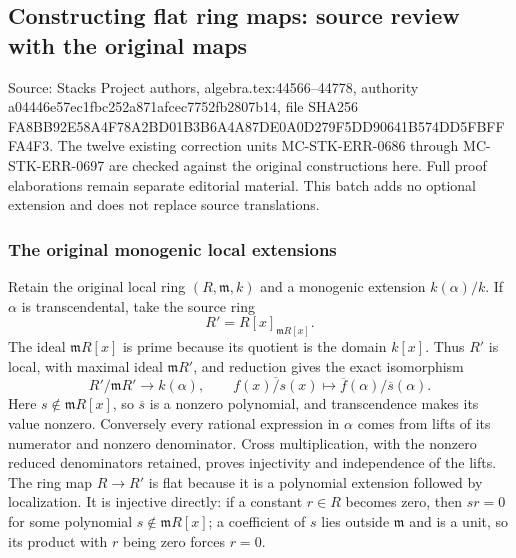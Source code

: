 \subsection{Constructing flat ring maps: source review with the original maps}\label{algebra-proof-064-constructing-flat-ring-maps-source-review-with-the-original-maps}

Source: Stacks Project authors, algebra.\AlgebraIdentifierBreak{}tex:\AlgebraIdentifierBreak{}44566--\AlgebraIdentifierBreak{}44778, authority a044\allowbreak{}46e5\allowbreak{}7ec1\allowbreak{}fbc2\allowbreak{}52a8\allowbreak{}71af\allowbreak{}cec7\allowbreak{}752f\allowbreak{}b280\allowbreak{}7b14, file SHA256 FA8B\allowbreak{}B92E\allowbreak{}58A4\allowbreak{}F78A\allowbreak{}2BD0\allowbreak{}1B3B\allowbreak{}6A4A\allowbreak{}87DE\allowbreak{}0A0D\allowbreak{}279F\allowbreak{}5DD9\allowbreak{}0641\allowbreak{}B574\allowbreak{}DD5F\allowbreak{}BFFF\allowbreak{}A4F3. The twelve existing correction units MC-\AlgebraIdentifierBreak{}STK-\AlgebraIdentifierBreak{}ERR-\AlgebraIdentifierBreak{}0686 through MC-\AlgebraIdentifierBreak{}STK-\AlgebraIdentifierBreak{}ERR-\AlgebraIdentifierBreak{}0697 are checked against the original constructions here. Full proof elaborations remain separate editorial material. This batch adds no optional extension and does not replace source translations.

\subsubsection{The original monogenic local extensions}\label{algebra-proof-064-the-original-monogenic-local-extensions}

Retain the original local ring \((R,\mathfrak m,k)\) and a monogenic extension \(k(\alpha)/k\). If \(\alpha\) is transcendental, take the source ring \[
 R'=R[x]_{\mathfrak mR[x]}.
\] The ideal \(\mathfrak mR[x]\) is prime because its quotient is the domain \(k[x]\). Thus \(R'\) is local, with maximal ideal \(\mathfrak mR'\), and reduction gives the exact isomorphism \[
 R'/\mathfrak mR'\longrightarrow k(\alpha),\qquad
 \overline{f(x)/s(x)}\longmapsto \overline f(\alpha)/\overline s(\alpha).
\] Here \(s\notin\mathfrak mR[x]\), so \(\overline s\) is a nonzero polynomial, and transcendence makes its value nonzero. Conversely every rational expression in \(\alpha\) comes from lifts of its numerator and nonzero denominator. Cross multiplication, with the nonzero reduced denominators retained, proves injectivity and independence of the lifts. The ring map \(R\to R'\) is flat because it is a polynomial extension followed by localization. It is injective directly: if a constant \(r\in R\) becomes zero, then \(sr=0\) for some polynomial \(s\notin\mathfrak mR[x]\); a coefficient of \(s\) lies outside \(\mathfrak m\) and is a unit, so its product with \(r\) being zero forces \(r=0\).

